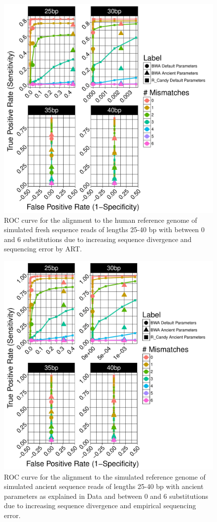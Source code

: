 \documentclass[11pt,a4paper]{report}
\begin{document}
\begin{figure}[H]
\centering
\includegraphics[width=12cm]{pictures/f_DS6_ART.pdf}
\caption{
ROC curve for the alignment to the human reference genome of simulated fresh 
sequence reads of lengths 25-40 bp with between 0 and 6 substitutions due 
to increasing sequence divergence and sequencing error by ART.
}
\label{DS6_ART}
\end{figure}



\begin{figure}[H]
\centering
\includegraphics[width=12cm]{pictures/f_DS1_ART.pdf}
\caption{
ROC curve for the alignment to the simulated reference genome of simulated ancient 
sequence reads of lengths 25-40 bp with ancient parameters as explained in Data 
and between 0 and 6 substitutions due to increasing sequence divergence and
empirical sequencing error.
}
\label{DS1_ART}
\end{figure}
\end{document}
